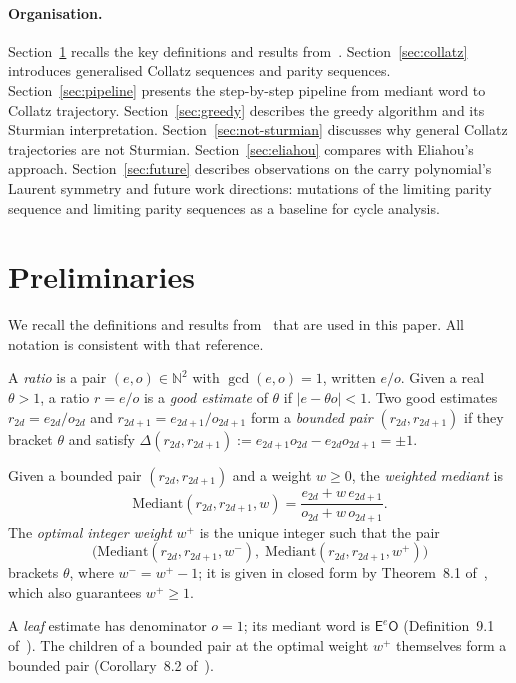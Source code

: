\documentclass[12pt]{article}
\theoremstyle{definition}
\theoremstyle{remark}
\theoremstyle{plain}
\newcommand{\NN}{\mathbb{N}}
\newcommand{\OO}{\mathsf{O}}
\newcommand{\EE}{\mathsf{E}}
\newcommand{\wplus}{w^{+}}
\newcommand{\wminus}{w^{-}}
\begin{document}
\paragraph{Organisation.}
Section~\ref{sec:prelim} recalls the key definitions and results from~\cite{paper76}.
Section~\ref{sec:collatz} introduces generalised Collatz sequences and parity
sequences.
Section~\ref{sec:pipeline} presents the step-by-step pipeline from mediant word
to Collatz trajectory.
Section~\ref{sec:greedy} describes the greedy algorithm and its Sturmian
interpretation.
Section~\ref{sec:not-sturmian} discusses why general Collatz trajectories are not
Sturmian.
Section~\ref{sec:eliahou} compares with Eliahou's approach.
Section~\ref{sec:future} describes observations on the carry polynomial's Laurent
symmetry and future work directions: mutations of the limiting parity sequence
and limiting parity sequences as a baseline for cycle analysis.

\section{Preliminaries}
\label{sec:prelim}

We recall the definitions and results from~\cite{paper76} that are used in this
paper.
All notation is consistent with that reference.

A \emph{ratio} is a pair $(e, o) \in \NN^2$ with $\gcd(e, o) = 1$, written $e/o$.
Given a real $\theta > 1$, a ratio $r = e/o$ is a \emph{good estimate} of $\theta$
if $|e - \theta o| < 1$.
Two good estimates $r_{2d} = e_{2d}/o_{2d}$ and $r_{2d+1} = e_{2d+1}/o_{2d+1}$ form a
\emph{bounded pair} $(r_{2d}, r_{2d+1})$ if they bracket $\theta$ and satisfy
$\Delta(r_{2d}, r_{2d+1}) := e_{2d+1} o_{2d} - e_{2d} o_{2d+1} = \pm 1$.

Given a bounded pair $(r_{2d}, r_{2d+1})$ and a weight $w \geq 0$, the
\emph{weighted mediant} is
\[
  \mathrm{Mediant}(r_{2d}, r_{2d+1}, w) = \frac{e_{2d} + w\,e_{2d+1}}{o_{2d} + w\,o_{2d+1}}.
\]
The \emph{optimal integer weight} $\wplus$ is the unique integer such that the pair
\[
  \bigl(\mathrm{Mediant}(r_{2d}, r_{2d+1}, \wminus),\;
         \mathrm{Mediant}(r_{2d}, r_{2d+1}, \wplus)\bigr)
\]
brackets $\theta$, where $\wminus = \wplus - 1$; it is given in closed form by
Theorem~8.1 of~\cite{paper76}, which also guarantees $\wplus \geq 1$.

A \emph{leaf} estimate has denominator $o = 1$; its mediant word is
$\EE^e\OO$ (Definition~9.1 of~\cite{paper76}).
The children of a bounded pair at the optimal weight $\wplus$ themselves form a
bounded pair (Corollary~8.2 of~\cite{paper76}).
\end{document}
